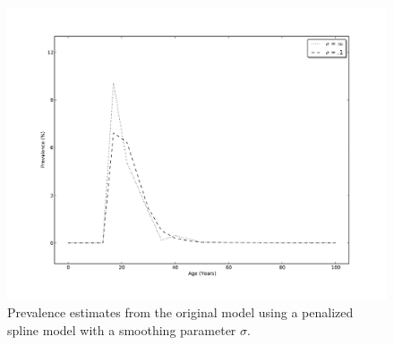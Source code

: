     \begin{figure}[h]
        \begin{center}
            \includegraphics[width=\textwidth]{applications/cannabis_dependence-smoothing.pdf}
            \caption{Prevalence estimates from the original model using a penalized spline model with a smoothing parameter $\sigma$. }
        \label{fig:app-cannabis_smoothing}
        \end{center}
    \end{figure}

